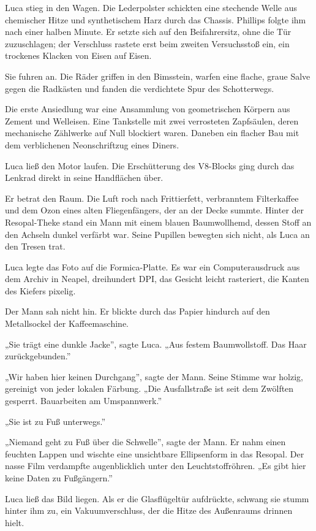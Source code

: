 \documentclass[
  ngerman,
]{article}
\begin{document}
Luca stieg in den Wagen. Die Lederpolster schickten eine stechende Welle
aus chemischer Hitze und synthetischem Harz durch das Chassis. Phillips
folgte ihm nach einer halben Minute. Er setzte sich auf den
Beifahrersitz, ohne die Tür zuzuschlagen; der Verschluss rastete erst
beim zweiten Versuchsstoß ein, ein trockenes Klacken von Eisen auf
Eisen.

Sie fuhren an. Die Räder griffen in den Bimsstein, warfen eine flache,
graue Salve gegen die Radkästen und fanden die verdichtete Spur des
Schotterwegs.

Die erste Ansiedlung war eine Ansammlung von geometrischen Körpern aus
Zement und Welleisen. Eine Tankstelle mit zwei verrosteten Zapfsäulen,
deren mechanische Zählwerke auf Null blockiert waren. Daneben ein
flacher Bau mit dem verblichenen Neonschriftzug eines Diners.

Luca ließ den Motor laufen. Die Erschütterung des V8-Blocks ging durch
das Lenkrad direkt in seine Handflächen über.

Er betrat den Raum. Die Luft roch nach Frittierfett, verbranntem
Filterkaffee und dem Ozon eines alten Fliegenfängers, der an der Decke
summte. Hinter der Resopal-Theke stand ein Mann mit einem blauen
Baumwollhemd, dessen Stoff an den Achseln dunkel verfärbt war. Seine
Pupillen bewegten sich nicht, als Luca an den Tresen trat.

Luca legte das Foto auf die Formica-Platte. Es war ein Computerausdruck
aus dem Archiv in Neapel, dreihundert DPI, das Gesicht leicht
rasteriert, die Kanten des Kiefers pixelig.

Der Mann sah nicht hin. Er blickte durch das Papier hindurch auf den
Metallsockel der Kaffeemaschine.

„Sie trägt eine dunkle Jacke'', sagte Luca. „Aus festem Baumwollstoff.
Das Haar zurückgebunden.''

„Wir haben hier keinen Durchgang'', sagte der Mann. Seine Stimme war
holzig, gereinigt von jeder lokalen Färbung. „Die Ausfallstraße ist seit
dem Zwölften gesperrt. Bauarbeiten am Umspannwerk.''

„Sie ist zu Fuß unterwegs.''

„Niemand geht zu Fuß über die Schwelle'', sagte der Mann. Er nahm einen
feuchten Lappen und wischte eine unsichtbare Ellipsenform in das
Resopal. Der nasse Film verdampfte augenblicklich unter den
Leuchtstoffröhren. „Es gibt hier keine Daten zu Fußgängern.''

Luca ließ das Bild liegen. Als er die Glasflügeltür aufdrückte, schwang
sie stumm hinter ihm zu, ein Vakuumverschluss, der die Hitze des
Außenraums drinnen hielt.
\end{document}
